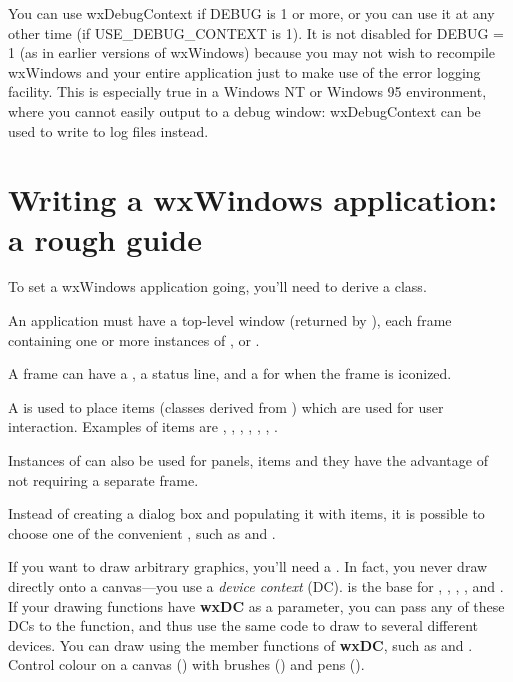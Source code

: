 You can use wxDebugContext if DEBUG is 1 or more, or you can use it
at any other time (if USE\_DEBUG\_CONTEXT is 1). It is not disabled
for DEBUG = 1 (as in earlier versions of wxWindows) because you
may not wish to recompile wxWindows and your entire application
just to make use of the error logging facility. This is especially
true in a Windows NT or Windows 95 environment, where you cannot
easily output to a debug window: wxDebugContext can be used to
write to log files instead.


%

\section{Writing a wxWindows application: a rough guide}\label{roughguide}

To set a wxWindows application going, you'll need to derive a  class.

An application must have a top-level  window (returned by ),
each frame containing one or more instances of , \rtfsp
or .

A frame can have a , a status line, and a  for
when the frame is iconized.

A  is used to place items (classes derived from )
which are used for user interaction. Examples of items are ,
\rtfsp{}, , , ,
\rtfsp{}, .

Instances of  can also be used for panels, items and they have
the advantage of not requiring a separate frame.

Instead of creating a dialog box and populating it with items, it is possible to choose
one of the convenient , such as \rtfsp
and .

If you want to draw arbitrary graphics, you'll need a . In fact,
you never draw directly onto a canvas---you use a {\it device context} (DC).  is
the base for , , ,
\rtfsp{},  and .
If your drawing functions have {\bf wxDC} as a parameter, you can pass any of these DCs
to the function, and thus use the same code to draw to several different devices.
You can draw using the member functions of {\bf wxDC}, such as \rtfsp
and . Control colour on a canvas () with
brushes () and pens ().

